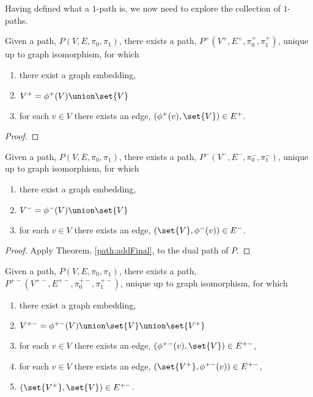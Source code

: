 Having defined what a $1$-path is, we now need to explore the collection of $1$-paths.

\begin{theorem}\label{path:addFinal}
Given a path, $P(V, E, \pi_0, \pi_1)$, there exists a path, $P^+(V^+, E^+, \pi^+_0,
\pi^+_1)$,  unique up to graph isomorphism, for which
\begin{enumerate}
\item there exist a graph embedding, 
\item $V^+ = \phi^+(V) \union \set{V}$
\item for each $v \in V$ there exists an edge, $(\phi^+(v), \set{V}) \in E^+$.
\end{enumerate}
\end{theorem}

\begin{proof}
\end{proof}

\begin{corollary}\label{path:addInitial}
Given a path, $P(V, E, \pi_0, \pi_1)$, there exists a path, $P^-(V^-, E^-, \pi^-_0,
\pi^-_1)$,  unique up to graph isomorphism, for which
\begin{enumerate}
\item there exist a graph embedding, 
\item $V^- = \phi^-(V) \union \set{V}$
\item for each $v \in V$ there exists an edge, $(\set{V}, \phi^-(v)) \in E^-$.
\end{enumerate}
\end{corollary}

\begin{proof}
Apply Theorem, \ref{path:addFinal}, to the dual path of $P$.
\end{proof}

\begin{corollary}
Given a path, $P(V, E, \pi_0, \pi_1)$, there exists a path, $P^{+-}(V^{+-}, E^{+-},
\pi^{+-}_0, \pi^{+-}_1)$,  unique up to graph isomorphism, for which
\begin{enumerate}
\item there exist a graph embedding, 
\item $V^{+-} = \phi^{+-}(V) \union \set{V} \union \set{V^+}$
\item for each $v \in V$ there exists an edge, $(\phi^{+-}(v), \set{V}) \in E^{+-}$,
\item for each $v \in V$ there exists an edge, $(\set{V^+}, \phi^{+-}(v)) \in E^{+-}$,
\item $(\set{V^+}, \set{V}) \in E^{+-}$.
\end{enumerate}
\end{corollary}

